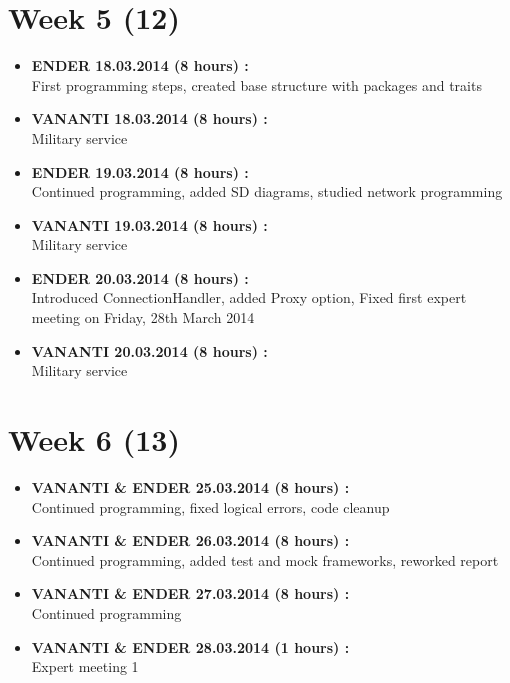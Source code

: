 \documentclass[
	a4paper,					10pt,							twoside,					openright,				notitlepage,			parskip=half,			]{scrreprt}
\begin{document}
\section*{Week 5 (12)}
\label{sec:worklog_05}
\begin{itemize}
\item{\textbf{ENDER 18.03.2014 (8 hours) :} \\  First programming steps, created base structure with packages and traits}
\item{\textbf{VANANTI 18.03.2014 (8 hours) :} \\  Military service}
\item{\textbf{ENDER 19.03.2014 (8 hours) :} \\  Continued programming, added SD diagrams, studied network programming}
\item{\textbf{VANANTI 19.03.2014 (8 hours) :} \\  Military service}
\item{\textbf{ENDER 20.03.2014 (8 hours) :} \\  Introduced ConnectionHandler, added Proxy option, Fixed first expert meeting 
on Friday, 28th March 2014}
\item{\textbf{VANANTI 20.03.2014 (8 hours) :} \\  Military service}
\end{itemize}
\section*{Week 6 (13)}
\label{sec:worklog_06}
\begin{itemize}
\item{\textbf{VANANTI \& ENDER 25.03.2014 (8 hours) :} \\  Continued programming, fixed logical errors, code cleanup}
\item{\textbf{VANANTI \& ENDER 26.03.2014 (8 hours) :} \\  Continued programming, added test and mock frameworks, reworked report}
\item{\textbf{VANANTI \& ENDER 27.03.2014 (8 hours) :} \\  Continued programming}
\item{\textbf{VANANTI \& ENDER 28.03.2014 (1 hours) :} \\  Expert meeting 1}
\end{itemize}
\end{document}

